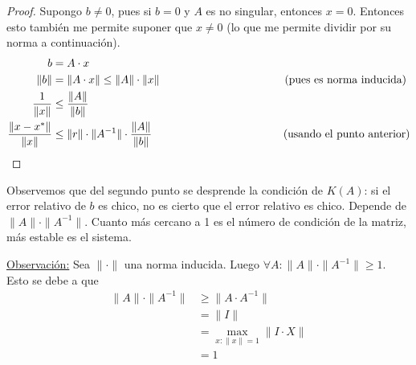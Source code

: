 \documentclass[]{article}
\begin{document}
\begin{prop}
\begin{proof}
		Supongo $b\neq 0$, pues si $b=0$ y $A$ es no singular, entonces $x=0$. Entonces esto también me permite suponer que $x\neq 0$ (lo que me permite dividir por su norma a continuación).
		\begin{align*}
			b &=A\cdot x\\
			\|b\| &= \|A\cdot x\| \leq \|A\|\cdot\|x\| \hspace{4cm} \text{(pues es norma inducida)}\\
			\dfrac{1}{\|x\|} &\leq \dfrac{\|A\|}{\|b\|}\\
			\dfrac{\|x-x^*\|}{\|x\|} &\leq \|r\|\cdot\|A^{-1}\|\cdot\dfrac{\|A\|}{\|b\|} \hspace{4.2cm} \text{(usando el punto anterior)}
		\end{align*}
	\end{proof}
\end{prop}

Observemos que del segundo punto se desprende la condición de $K(A)$: si el error relativo de $b$ es chico, no es cierto que el error relativo es chico. Depende de $\|A\|\cdot\|A^{-1}\|$. Cuanto más cercano a 1 es el número de condición de la matriz, más estable es el sistema.

\underline{Observación:} Sea $\|\cdot\|$ una norma inducida. Luego $\forall A: \|A\|\cdot\|A^{-1}\| \geq 1$. Esto se debe a que
\begin{align*}
	\|A\|\cdot\|A^{-1}\| &\geq \|A \cdot A^{-1}\| \\
	&= \|I\| \\
	&= \displaystyle \max_{x:\|x\|=1}{\|I\cdot X\|} \\
	&= 1 \\
\end{align*}
\end{document}
